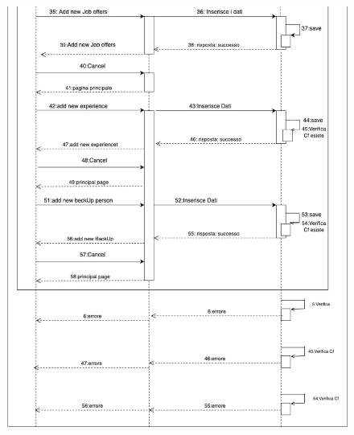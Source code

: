 \documentclass[ 4paper,11pt,openany]{book}
\begin{document}
\begin{figure}[htpb!] 
	\includegraphics[height=250mm,width=180mm]{Seq_Dipendenti_Completo2.jpeg}
\end{figure}
\end{document}
